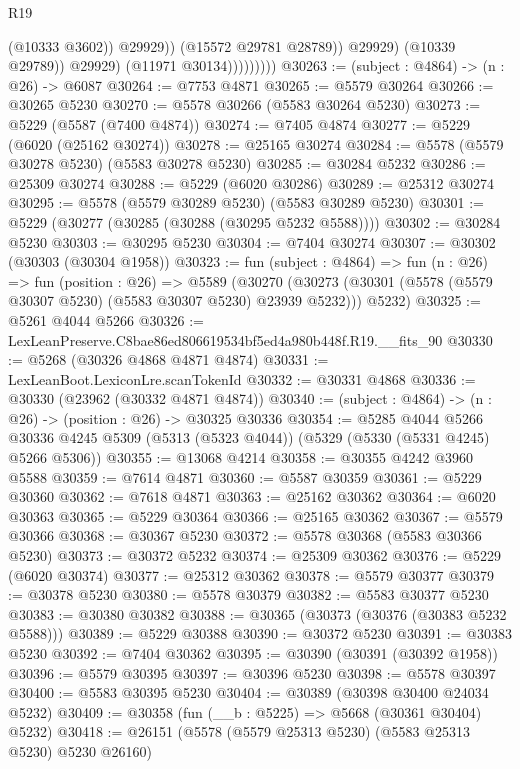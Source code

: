 \begin{lexlean}{R19}
\begin{coremodule}
                                  (@10333 @3602))
                                @29929))
                            (@15572 @29781 @28789))
                          @29929)
                        (@10339 @29789))
                      @29929)
                    (@11971 @30134)))))))))
@30263 := (subject : @4864) -> (n : @26) -> @6087
@30264 := @7753 @4871
@30265 := @5579 @30264
@30266 := @30265 @5230
@30270 := @5578 @30266 (@5583 @30264 @5230)
@30273 := @5229 (@5587 (@7400 @4874))
@30274 := @7405 @4874
@30277 := @5229 (@6020 (@25162 @30274))
@30278 := @25165 @30274
@30284 := @5578 (@5579 @30278 @5230) (@5583 @30278 @5230)
@30285 := @30284 @5232
@30286 := @25309 @30274
@30288 := @5229 (@6020 @30286)
@30289 := @25312 @30274
@30295 := @5578 (@5579 @30289 @5230) (@5583 @30289 @5230)
@30301 := @5229 (@30277 (@30285 (@30288 (@30295 @5232 @5588))))
@30302 := @30284 @5230
@30303 := @30295 @5230
@30304 := @7404 @30274
@30307 := @30302 (@30303 (@30304 @1958))
@30323 := fun (subject : @4864) =>
  fun (n : @26) =>
  fun (position : @26) =>
  @5589
    (@30270 (@30273 (@30301 (@5578 (@5579 @30307 @5230) (@5583 @30307 @5230) @23939 @5232))) @5232)
@30325 := @5261 @4044 @5266
@30326 := LexLeanPreserve.C8bae86ed806619534bf5ed4a980b448f.R19.__fits_90
@30330 := @5268 (@30326 @4868 @4871 @4874)
@30331 := LexLeanBoot.LexiconLre.scanTokenId
@30332 := @30331 @4868
@30336 := @30330 (@23962 (@30332 @4871 @4874))
@30340 := (subject : @4864) -> (n : @26) -> (position : @26) -> @30325 @30336
@30354 := @5285
    @4044
    @5266
    @30336
    @4245
    @5309
    (@5313 (@5323 @4044))
    (@5329 (@5330 (@5331 @4245) @5266 @5306))
@30355 := @13068 @4214
@30358 := @30355 @4242 @3960 @5588
@30359 := @7614 @4871
@30360 := @5587 @30359
@30361 := @5229 @30360
@30362 := @7618 @4871
@30363 := @25162 @30362
@30364 := @6020 @30363
@30365 := @5229 @30364
@30366 := @25165 @30362
@30367 := @5579 @30366
@30368 := @30367 @5230
@30372 := @5578 @30368 (@5583 @30366 @5230)
@30373 := @30372 @5232
@30374 := @25309 @30362
@30376 := @5229 (@6020 @30374)
@30377 := @25312 @30362
@30378 := @5579 @30377
@30379 := @30378 @5230
@30380 := @5578 @30379
@30382 := @5583 @30377 @5230
@30383 := @30380 @30382
@30388 := @30365 (@30373 (@30376 (@30383 @5232 @5588)))
@30389 := @5229 @30388
@30390 := @30372 @5230
@30391 := @30383 @5230
@30392 := @7404 @30362
@30395 := @30390 (@30391 (@30392 @1958))
@30396 := @5579 @30395
@30397 := @30396 @5230
@30398 := @5578 @30397
@30400 := @5583 @30395 @5230
@30404 := @30389 (@30398 @30400 @24034 @5232)
@30409 := @30358 (fun (__b : @5225) => @5668 (@30361 @30404) @5232)
@30418 := @26151 (@5578 (@5579 @25313 @5230) (@5583 @25313 @5230) @5230 @26160)

\end{coremodule}
\end{lexlean}
